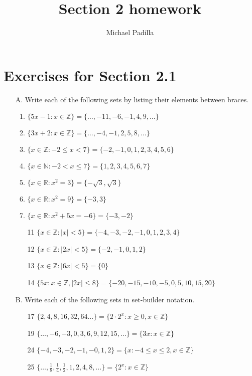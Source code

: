 \documentclass[12pt]{article}
\title{Section 2 homework}
\author{Michael Padilla}
\begin{document}
\maketitle

\section*{Exercises for Section 2.1}
\begin{itemize}
    \item[A.] Write each of the following sets by listing their elements between braces.
	\begin{enumerate}
	    \item $\{5x - 1 : x \in \mathbb{Z}\} = \{\ldots, -11, -6, -1, 4, 9, \ldots\}$
	    \item $\{3x + 2 : x \in \mathbb{Z}\} = \{\ldots, -4, -1, 2, 5, 8, \ldots\}$
	    \item $\{x \in \mathbb{Z} : -2 \le x < 7\} = \{-2, -1, 0, 1, 2, 3, 4, 5, 6\}$
	    \item $\{x \in \mathbb{N} : -2 < x \le 7\} = \{1, 2, 3, 4, 5, 6, 7 \}$
	    \item $\{x \in \mathbb{R} : x^2 = 3\} = \{-\sqrt{3}, \sqrt{3}  \}$
	    \item $\{x \in \mathbb{R} : x^2 = 9\} = \{-3, 3  \}$
	    \item $\{x \in \mathbb{R} : x^2 + 5x = -6\} = \{-3, -2  \}$
	    \item[11] $\{x \in \mathbb{Z} : |x| < 5 \} = \{-4, -3, -2, -1, 0, 1, 2, 3, 4  \}$
	    \item[12] $\{x \in \mathbb{Z} : |2x| < 5 \} = \{-2, -1, 0, 1, 2 \}$
	    \item[13] $\{x \in \mathbb{Z} : |6x| < 5 \} = \{0\}$
	    \item[14] $\{5x : x \in \mathbb{Z}, |2x| \le 8 \} = \{-20, -15, -10, -5, 0, 5, 10, 15, 20 \}$
	\end{enumerate}
    \item[B.] Write each of the following sets in set-builder notation.
	\begin{enumerate}
	    \item[17] $\{2,4,8,16,32,64\ldots\} = \{2 \cdot 2^x: x \ge 0, x \in \mathbb{Z}\}$
	    \item[19] $\{\ldots, -6, -3, 0, 3, 6, 9, 12, 15, \ldots \} = \{3x: x \in \mathbb{Z}\}$
	    \item[24] $\{-4,-3,-2,-1,-0,1,2\} = \{x: -4 \le x \le 2, x \in \mathbb{Z}\}$
	    \item[25] $\{\ldots, \frac{1}{8} ,\frac{1}{4} ,\frac{1}{2},1,2,4,8, \ldots\} = \{2^x:x \in \mathbb{Z}\}$

\end{enumerate}
\end{itemize}
\end{document}
